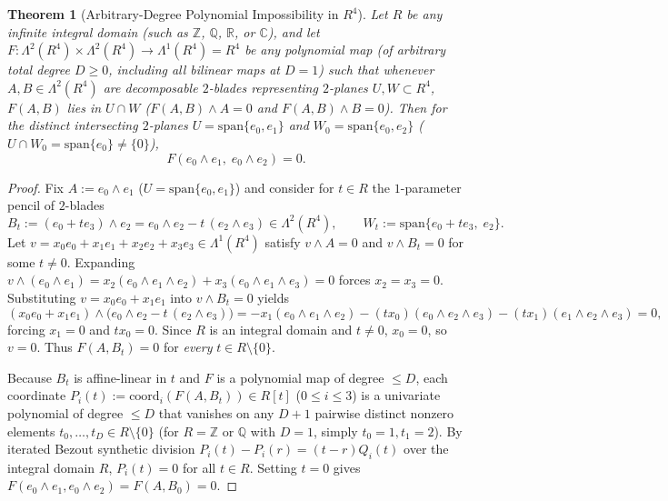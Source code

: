 \documentclass[11pt]{article}
\newtheorem{theorem}{Theorem}[section]
\theoremstyle{definition}
\newcommand{\spn}{\mathrm{span}}
\begin{document}
\begin{theorem}[Arbitrary-Degree Polynomial Impossibility in $R^4$]\label{thm:r2-poly}
Let $R$ be any infinite integral domain (such as $\mathbb{Z}$, $\mathbb{Q}$, $\mathbb{R}$, or $\mathbb{C}$), and let $F : \Lambda^2(R^4) \times \Lambda^2(R^4) \to \Lambda^1(R^4) = R^4$ be \emph{any} polynomial map (of arbitrary total degree $D \ge 0$, including all bilinear maps at $D = 1$) such that whenever $A, B \in \Lambda^2(R^4)$ are decomposable $2$-blades representing $2$-planes $U, W \subset R^4$, $F(A, B)$ lies in $U \cap W$ ($F(A,B) \wedge A = 0$ and $F(A,B) \wedge B = 0$). Then for the distinct intersecting $2$-planes $U = \spn\{e_0, e_1\}$ and $W_0 = \spn\{e_0, e_2\}$ ($U \cap W_0 = \spn\{e_0\} \neq \{0\}$),
\[
  F(e_0 \wedge e_1,\; e_0 \wedge e_2) = 0.
\]
\end{theorem}
\begin{proof}
Fix $A := e_0 \wedge e_1$ ($U = \spn\{e_0, e_1\}$) and consider for $t \in R$ the $1$-parameter pencil of $2$-blades
\[
  B_t := (e_0 + t e_3) \wedge e_2 = e_0 \wedge e_2 - t\,(e_2 \wedge e_3) \in \Lambda^2(R^4), \qquad W_t := \spn\{e_0 + t e_3,\; e_2\}.
\]
Let $v = x_0 e_0 + x_1 e_1 + x_2 e_2 + x_3 e_3 \in \Lambda^1(R^4)$ satisfy $v \wedge A = 0$ and $v \wedge B_t = 0$ for some $t \neq 0$. Expanding $v \wedge (e_0 \wedge e_1) = x_2(e_0 \wedge e_1 \wedge e_2) + x_3(e_0 \wedge e_1 \wedge e_3) = 0$ forces $x_2 = x_3 = 0$. Substituting $v = x_0 e_0 + x_1 e_1$ into $v \wedge B_t = 0$ yields
\[
  (x_0 e_0 + x_1 e_1) \wedge \bigl(e_0 \wedge e_2 - t\,(e_2 \wedge e_3)\bigr)
  = -x_1(e_0 \wedge e_1 \wedge e_2) - (t x_0)(e_0 \wedge e_2 \wedge e_3) - (t x_1)(e_1 \wedge e_2 \wedge e_3) = 0,
\]
forcing $x_1 = 0$ and $t x_0 = 0$. Since $R$ is an integral domain and $t \neq 0$, $x_0 = 0$, so $v = 0$. Thus $F(A, B_t) = 0$ for \emph{every} $t \in R \setminus \{0\}$.

Because $B_t$ is affine-linear in $t$ and $F$ is a polynomial map of degree $\le D$, each coordinate $P_i(t) := \mathrm{coord}_i(F(A, B_t)) \in R[t]$ ($0 \le i \le 3$) is a univariate polynomial of degree $\le D$ that vanishes on any $D + 1$ pairwise distinct nonzero elements $t_0, \dots, t_D \in R \setminus \{0\}$ (for $R = \mathbb{Z}$ or $\mathbb{Q}$ with $D = 1$, simply $t_0 = 1, t_1 = 2$). By iterated Bezout synthetic division $P_i(t) - P_i(r) = (t - r) Q_i(t)$ over the integral domain $R$, $P_i(t) = 0$ for all $t \in R$. Setting $t = 0$ gives $F(e_0 \wedge e_1, e_0 \wedge e_2) = F(A, B_0) = 0$.
\end{proof}
\end{document}
